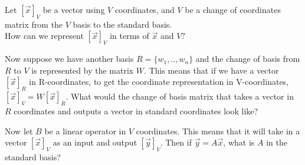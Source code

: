   \begin{enumerate}[resume]
  \qitem Let $[\vec{x}]_V$ be a vector using $V$ coordinates, and $V$ be a change of coordinates matrix from the $V$ basis to the standard basis. \\
  How can we represent $[\vec{x}]_V$ in terms of $\vec{x}$ and $V?$

  \qitem Now suppose we have another basis $R = \{w_1, .. , w_n\}$ and the change of basis from $R$ to $V$ is represented by the matrix $W.$ This means that if we have a vector $[\vec{x}]_R$ in R-coordinates, to get the coordinate representation in V-coordinates, $[\vec{x}]_V = W[\vec{x}]_R.$ What would the change of basis matrix that takes a vector in $R$ coordinates and outputs a vector in standard coordinates look like?



  \qitem Now let $B$ be a linear operator in $V$ coordinates.
  This means that it will take in a vector $[\vec{x}]_V$ as an input and output $[\vec{y}]_V$.
  Then if $\vec{y} = A \vec{x}$, what is $A$ in the standard basis?


\end{enumerate}
